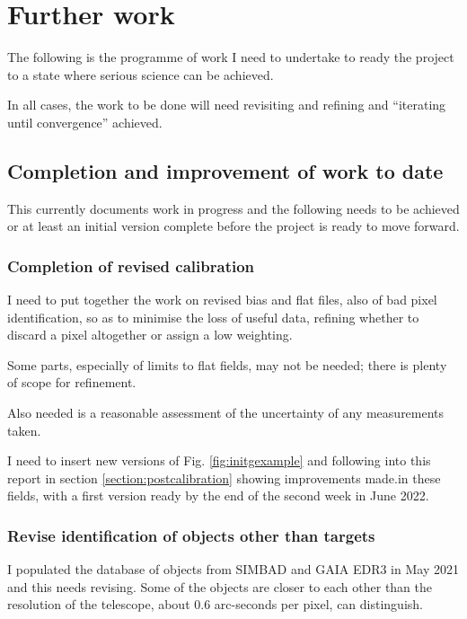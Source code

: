 \section{Further work}
\protect\label{section:worktocome}

The following is the programme of work I need to undertake to ready the project
to a state where serious science can be achieved.

In all cases, the work to be done will need revisiting and refining and
``iterating until convergence'' achieved.

\subsection{Completion and improvement of work to date}
\protect\label{section:fwimprovecompletion}

This currently documents work in progress and the following needs to be achieved
or at least an initial version complete before the project is ready to move
forward.

\subsubsection{Completion of revised calibration}
\protect\label{section:fwcalib}

I need to put together the work on revised bias and flat files, also of bad
pixel identification, so as to minimise the loss of useful data, refining whether
to discard a pixel altogether or assign a low weighting.

Some parts, especially of limits to flat fields, may not be needed; there is
plenty of scope for refinement.

Also needed is a reasonable assessment of the uncertainty of any measurements
taken.

I need to insert new versions of Fig. \ref{fig:initgexample} and following
into this report in section \ref{section:postcalibration} showing improvements
made.in these fields, with a first version ready by the end of the second week
in June 2022.

\subsubsection{Revise identification of objects other than targets}
\protect\label{section:fwtargets}

I populated the database of objects from SIMBAD and GAIA EDR3 in May 2021 and
this needs revising. Some of the objects are closer to each other than the
resolution of the telescope, about 0.6 arc-seconds per pixel, can distinguish.

